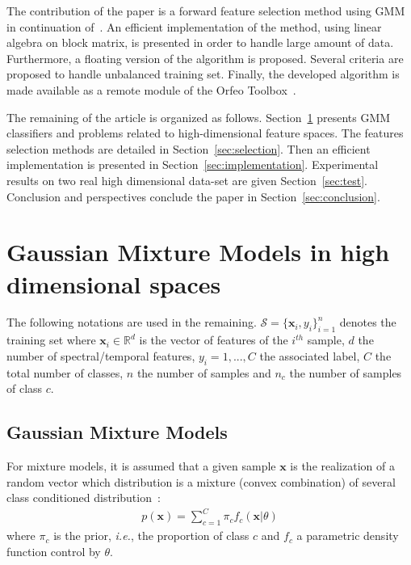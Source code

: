 \documentclass[journal]{IEEEtran}
\begin{document}
The contribution of the paper is a forward feature selection method using GMM in continuation of~\cite{fauvel2015fast}. An efficient implementation of the method, using linear algebra on block matrix, is presented in order to handle large amount of data. Furthermore, a floating version of the algorithm is proposed. Several criteria are proposed to handle unbalanced training set.  Finally, the developed algorithm is made available as a remote module of the Orfeo Toolbox~\cite{christophe2008orfeo}.


The     remaining    of     the     article     is    organized     as
follows.   Section~\ref{sec:gmm-hd}  presents   GMM  classifiers   and
problems  related to  high-dimensional  feature  spaces. The  features
selection methods are detailed in Section~\ref{sec:selection}. Then an
efficient         implementation        is         presented        in
Section~\ref{sec:implementation}.  Experimental  results on  two  real
high dimensional data-set are given Section~\ref{sec:test}. Conclusion
and perspectives conclude the paper in Section~\ref{sec:conclusion}.

\section{Gaussian Mixture Models in high dimensional spaces}
\label{sec:gmm-hd}

The    following    notations    are   used    in    the    remaining.
$\mathcal{S}  = \{\mathbf{x}_i,y_i\}_{i=1}^{n}$  denotes the  training
set where $\mathbf{x}_i \in \mathbb{R}^d$ is the vector of features of
the  $i^{th}$ sample,  $d$  the number  of spectral/temporal  features,
$y_i = 1,...,C$ the associated label, $C$ the total number of classes,
$n$ the  number of samples  and $n_c$ the  number of samples  of class
$c$.

    \subsection{Gaussian Mixture Models}

    For mixture models, it is assumed  that a given sample $\mathbf{x}$ is
    the realization  of a  random vector which  distribution is  a mixture
    (convex     combination)     of      several     class     conditioned
    distribution~\cite{Fraley00model-basedclustering}:
    \begin{align}
        p(\mathbf{x}) = \sum_{c=1}^{C} \pi_c f_c(\mathbf{x}|\theta)
    \end{align}
    where $\pi_c$ is  the prior, \emph{i.e.}, the  proportion of class
    $c$  and  $f_c$  a  parametric density  function  control by
    $\theta$.
\end{document}
